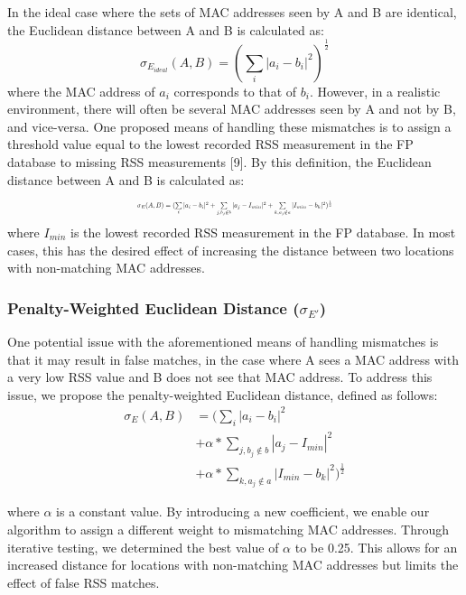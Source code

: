 \documentclass[conference]{IEEEtran}
\begin{document}
\indent In the ideal case where the sets of MAC addresses seen by A and B are identical, the Euclidean distance between A and B is calculated as:
\begin{equation}
\label{euclidean_ideal}
\sigma_{E_{ideal}}(A, B) = (\sum\limits_{i}|a_i - b_i|^2)^\frac{1}{2}
\end{equation}
where the MAC address of $a_i$ corresponds to that of $b_i$. However, in a realistic environment, there will often be several MAC addresses seen by A and not by B, and vice-versa. One proposed means of handling these mismatches is to assign a threshold value equal to the lowest recorded RSS measurement in the FP database to missing RSS measurements [9]. By this definition, the Euclidean distance between A and B is calculated as:
\begin{equation}
\label{euclidean}
\resizebox{0.45\textwidth}{!}{$\sigma_{E}(A, B)=(\sum\limits_{i}|a_i-b_i|^2+\sum\limits_{j, b_j\notin b}|a_j-I_{min}|^2+\sum\limits_{k, a_j\notin a}|I_{min}-b_k|^2)^\frac{1}{2}$}
\end{equation}
where $I_{min}$ is the lowest recorded RSS measurement in the FP database. In most cases, this has the desired effect of increasing the distance between two locations with non-matching MAC addresses.

\subsubsection{Penalty-Weighted Euclidean Distance ($\sigma_{E'}$)}
\indent One potential issue with the aforementioned means of handling mismatches is that it may result in false matches, in the case where A sees a MAC address with a very low RSS value and B does not see that MAC address. To address this issue, we propose the penalty-weighted Euclidean distance, defined as follows:
\begin{equation} \label{eq1}
\begin{split}
\sigma_{E}(A, B) & = (\sum\limits_{i}|a_i-b_i|^2 \\
			& +  \alpha*\sum\limits_{j, b_j\notin b}|a_j-I_{min}|^2 \\
			& + \alpha*\sum\limits_{k, a_j\notin a}|I_{min}-b_k|^2)^\frac{1}{2}
\end{split}
\end{equation}

where $\alpha$ is a constant value. By introducing a new coefficient, we enable our algorithm to assign a different weight to mismatching MAC addresses.  Through iterative testing, we determined the best value of $\alpha$ to be 0.25. This allows for an increased distance for locations with non-matching MAC addresses but limits the effect of false RSS matches.
	
\end{document}
